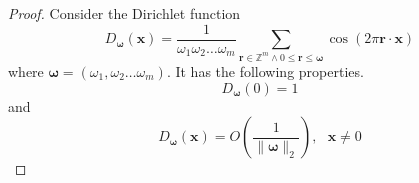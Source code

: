 \documentclass[multixcb]{amstext-l}
\theoremstyle{plain}
\theoremstyle{definition}
\theoremstyle{definition}
\theoremstyle{remark}
\numberwithin{equation}{chapter}
\begin{document}
\begin{proof}

Consider the Dirichlet function \begin{equation}
    D_{\boldsymbol{\omega}}(\boldsymbol{x}) = \frac{1}{\omega_1\omega_2\ldots\omega_m}\sum\limits_{\boldsymbol{r}\in \mathbb{Z}^m\land 0\le \boldsymbol{r}\le \boldsymbol{\omega}} \cos{(2\pi \boldsymbol{r}\cdot \boldsymbol{x})} 
\end{equation} where $\boldsymbol{\omega} = (\omega_1,\omega_2\ldots \omega_m)$.
It has the following properties. \begin{equation}\label{Dir_1}
    D_{\boldsymbol{\omega}}(0) = 1
\end{equation} and \begin{equation}\label{Dir_2}
    D_{\boldsymbol{\omega}}(\boldsymbol{x}) = O(\frac{1}{\|\boldsymbol{\omega}\|_2}),\mbox{   }\boldsymbol{x}\ne 0
\end{equation}


\end{proof}
\end{document}
